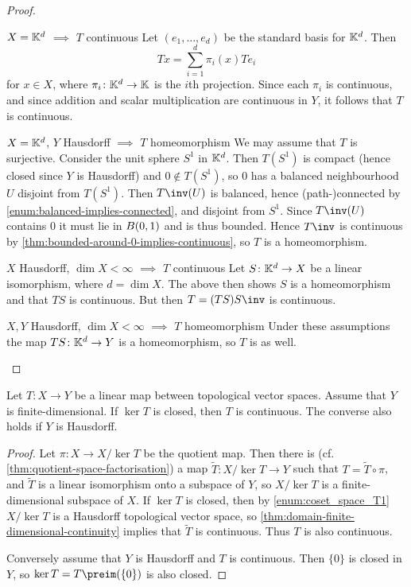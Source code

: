 \documentclass[article, a4paper, 11pt, oneside]{memoir}
\numberwithin{equation}{chapter}
\begin{document}
\begin{proof}
\begin{proofsec}
    \item[$X = \mathbb{K}^d$ $\implies$ $T$ continuous]
    Let $(e_1, \ldots, e_d)$ be the standard basis for $\mathbb{K}^d$. Then
    \begin{equation*}
        Tx = \sum_{i=1}^d \pi_i(x) Te_i
    \end{equation*}
    for $x \in X$, where $\pi_i \colon \mathbb{K}^d \to \mathbb{K}$ is the $i$th projection. Since each $\pi_i$ is continuous, and since addition and scalar multiplication are continuous in $Y$, it follows that $T$ is continuous.

    \item[$X = \mathbb{K}^d$, $Y$ Hausdorff $\implies$ $T$ homeomorphism]
    We may assume that $T$ is surjective. Consider the unit sphere $S^1$ in $\mathbb{K}^d$. Then $T(S^1)$ is compact (hence closed since $Y$ is Hausdorff) and $0 \not\in T(S^1)$, so $0$ has a balanced neighbourhood $U$ disjoint from $T(S^1)$. Then $T\inv(U)$ is balanced, hence (path-)connected by \cref{enum:balanced-implies-connected}, and disjoint from $S^1$. Since $T\inv(U)$ contains $0$ it must lie in $B_{}(0,1)$ and is thus bounded. Hence $T\inv$ is continuous by \cref{thm:bounded-around-0-implies-continuous}, so $T$ is a homeomorphism.
    
    \item[$X$ Hausdorff, $\dim X < \infty$ $\implies$ $T$ continuous]
    Let $S \colon \mathbb{K}^d \to X$ be a linear isomorphism, where $d = \dim X$. The above then shows $S$ is a homeomorphism and that $TS$ is continuous. But then $T = (TS)S\inv$ is continuous.

    \item[$X,Y$ Hausdorff, $\dim X < \infty$ $\implies$ $T$ homeomorphism]
    Under these assumptions the map $TS \colon \mathbb{K}^d \to Y$ is a homeomorphism, so $T$ is as well.
\end{proofsec}
\end{proof}


\begin{theorem}
    Let $T \colon X \to Y$ be a linear map between topological vector spaces. Assume that $Y$ is finite-dimensional. If $\ker T$ is closed, then $T$ is continuous. The converse also holds if $Y$ is Hausdorff.
\end{theorem}

\begin{proof}
    Let $\pi \colon X \to X/\ker T$ be the quotient map. Then there is (cf. \cref{thm:quotient-space-factorisation}) a map $\tilde{T} \colon X/\ker T \to Y$ such that $T = \tilde{T} \circ \pi$, and $\tilde{T}$ is a linear isomorphism onto a subspace of $Y$, so $X/\ker T$ is a finite-dimensional subspace of $X$. If $\ker T$ is closed, then by \cref{enum:coset_space_T1} $X/\ker T$ is a Hausdorff topological vector space, so \cref{thm:domain-finite-dimensional-continuity} implies that $\tilde{T}$ is continuous. Thus $T$ is also continuous.

    Conversely assume that $Y$ is Hausdorff and $T$ is continuous. Then $\{0\}$ is closed in $Y$, so $\ker T = T\preim(\{0\})$ is also closed.
\end{proof}
\end{document}
